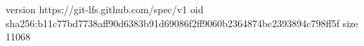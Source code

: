version https://git-lfs.github.com/spec/v1
oid sha256:b11c77bd7738aff90d6383b91d69086f2ff9060b2364874bc2393894c798ff5f
size 11068
